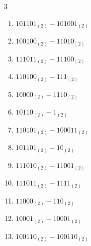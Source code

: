\begin{multicols}{3}
\begin{enumerate}

  \item $101101_{(2)} - 101001_{(2)}$


  \item $100100_{(2)} - 11010_{(2)}$


  \item $111011_{(2)} - 11100_{(2)}$


\columnbreak %

\resetques

  \item $110100_{(2)} - 111_{(2)}$


  \item $10000_{(2)} - 1110_{(2)}$


  \item $10110_{(2)} - 1_{(2)}$


  \item $110101_{(2)} - 100011_{(2)}$


  \item $101101_{(2)} - 10_{(2)}$


  \item $111010_{(2)} - 11001_{(2)}$


  \item $111011_{(2)} - 1111_{(2)}$


  \item $11000_{(2)} - 110_{(2)}$


  \item $10001_{(2)} - 10001_{(2)}$


  \item $100110_{(2)} - 100110_{(2)}$



\end{enumerate}
\end{multicols}

